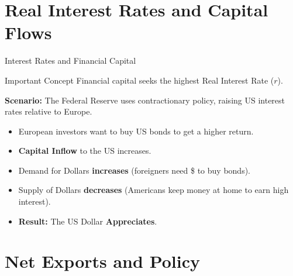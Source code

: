 \documentclass[aspectratio=169]{beamer}
\begin{document}
\section{Real Interest Rates and Capital Flows}

\begin{frame}{Interest Rates and Financial Capital}
    \begin{alertblock}{Important Concept}
        Financial capital seeks the highest Real Interest Rate ($r$).
    \end{alertblock}
    \vspace{0.3cm}
    \textbf{Scenario:} The Federal Reserve uses contractionary policy, raising US interest rates relative to Europe.
    \begin{itemize}
        \item European investors want to buy US bonds to get a higher return.
        \item \textbf{Capital Inflow} to the US increases.
        \item Demand for Dollars \textbf{increases} (foreigners need \$ to buy bonds).
        \item Supply of Dollars \textbf{decreases} (Americans keep money at home to earn high interest).
        \item \textbf{Result:} The US Dollar \textbf{Appreciates}.
    \end{itemize}
\end{frame}

\section{Net Exports and Policy}
\end{document}
